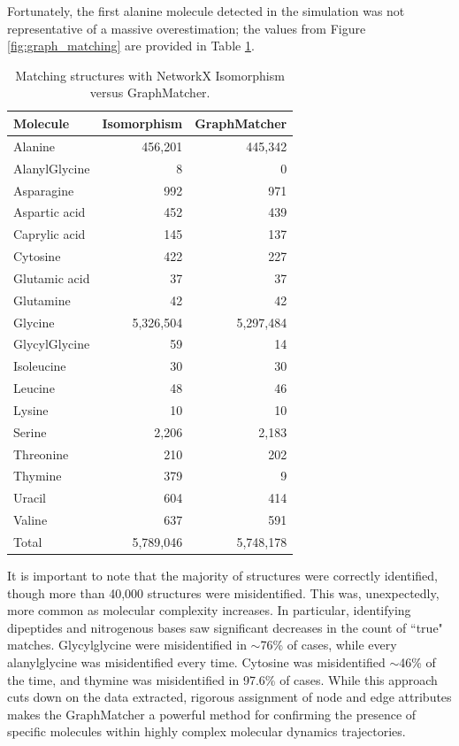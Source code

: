 Fortunately, the first alanine molecule detected in the simulation was not representative of a massive overestimation; the values from Figure \ref{fig:graph_matching} are provided in Table \ref{tbl:graphmatcher_counts}.

\begin{table}[h!]
\centering
\caption[Comparison of Isomorphism versus GraphMatcher identification]{Matching structures with NetworkX Isomorphism versus GraphMatcher.
}\label{tbl:graphmatcher_counts}
\begin{tabularx}{0.51\textwidth}{lrr}  
\toprule
Molecule & Isomorphism & GraphMatcher \\
\midrule
Alanine & 456,201 & 445,342\\
AlanylGlycine & 8 & 0 \\
Asparagine & 992 & 971 \\
Aspartic acid & 452 & 439 \\
Caprylic acid & 145 & 137 \\
Cytosine & 422 & 227 \\
Glutamic acid & 37 & 37 \\
Glutamine & 42 & 42 \\ 
Glycine & 5,326,504 & 5,297,484 \\
GlycylGlycine & 59 & 14 \\
Isoleucine & 30 & 30 \\
Leucine & 48 & 46 \\
Lysine & 10 & 10 \\
Serine & 2,206 & 2,183 \\
Threonine & 210 & 202 \\
Thymine & 379 & 9 \\
Uracil & 604 & 414 \\
Valine & 637 & 591 \\
Total & 5,789,046 & 5,748,178 \\
\bottomrule
\end{tabularx}
\end{table}

It is important to note that the majority of structures were correctly identified, though more than 40,000 structures were misidentified.
This was, unexpectedly, more common as molecular complexity increases.
In particular, identifying dipeptides and nitrogenous bases saw significant decreases in the count of ``true" matches.
Glycylglycine were misidentified in $\sim$76\% of cases, while every alanylglycine was misidentified every time.
Cytosine was misidentified $\sim$46\% of the time, and thymine was misidentified in 97.6\% of cases.
While this approach cuts down on the data extracted, rigorous assignment of node and edge attributes makes the GraphMatcher a powerful method for confirming the presence of specific molecules within highly complex molecular dynamics trajectories.


